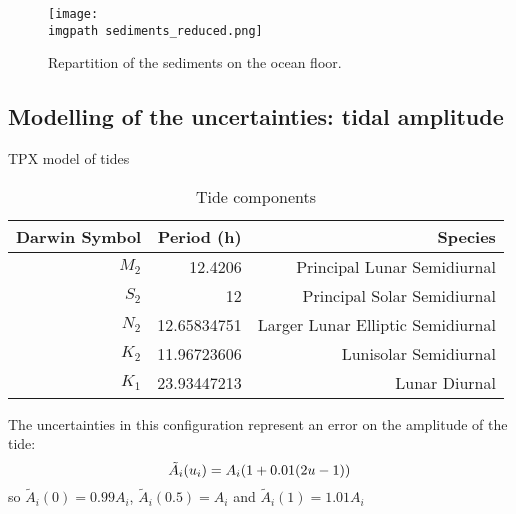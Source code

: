 \documentclass[../../Main_ManuscritThese.tex]{subfiles}
\newcommand\imgpath{/home/victor/acadwriting/Manuscrit/Text/Chapter5/img/}
\begin{document}
\begin{figure}[ht]
  \centering
  \texttt{[image: \\imgpath sediments\_reduced.png]}
  \caption{\label{fig:sediments_reduced} Repartition of the sediments on the ocean floor.}
\end{figure}


\subsection{Modelling of the uncertainties: tidal amplitude}
\cite{egbert_efficient_2002} TPX model of tides

\label{sec:tidal_modelling}
\begin{table}[!h]
  \centering %
  \begin{tabular}{rrr}\toprule
    Darwin Symbol & Period (h)   & Species                           \\ \midrule
    $M_2$         & 12.4206      & Principal Lunar Semidiurnal       \\
    $S_2$         & 12           & Principal Solar Semidiurnal       \\
    $N_2$         & 12.65834751  & Larger Lunar Elliptic Semidiurnal \\
    $K_2$         & 11.96723606  & Lunisolar Semidiurnal             \\
    $K_1$         & 23.93447213  & Lunar Diurnal                     \\
    \bottomrule
  \end{tabular}
  \caption{Tide components}
  \label{tab:tides_components}
\end{table}
The uncertainties in this configuration represent an error on the amplitude of the tide:
\begin{equation}
  \tilde{A}_i(u_i) = A_i (1 + 0.01(2u - 1))
\end{equation}
so $\tilde{A}_i(0) = 0.99A_i$, $\tilde{A}_i(0.5) = A_i$ and $\tilde{A}_i(1) = 1.01A_i$
\end{document}
